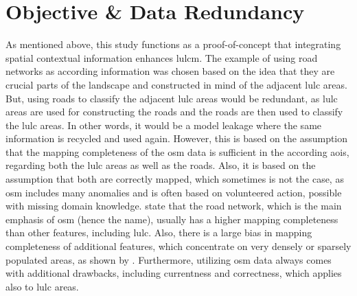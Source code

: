 \section{Objective \& Data Redundancy}

As mentioned above, this study functions as a proof-of-concept that integrating spatial contextual information enhances \gls{lulcm}. The example of using road networks as according information was chosen based on the idea that they are crucial parts of the landscape and constructed in mind of the adjacent \gls{lulc} areas. But, using roads to classify the adjacent \gls{lulc} areas would be redundant, as \gls{lulc} areas are used for constructing the roads and the roads are then used to classify the \gls{lulc} areas. In other words, it would be a model leakage where the same information is recycled and used again. However, this is based on the assumption that the mapping completeness of the \gls{osm} data is sufficient in the according \glspl{aoi}, regarding both the \gls{lulc} areas as well as the roads. Also, it is based on the assumption that both are correctly mapped, which sometimes is not the case, as \gls{osm} includes many anomalies and is often based on volunteered action, possible with missing domain knowledge. \textcite{Barrington-Leigh.Millard-Ball2017} state that the road network, which is the main emphasis of \gls{osm} (hence the name), usually has a higher mapping completeness than other features, including \gls{lulc}. Also, there is a large bias in mapping completeness of additional features, which concentrate on very densely or sparsely populated areas, as shown by \textcite{Herfort.Lautenbach.ea2021}. Furthermore, utilizing \gls{osm} data always comes with additional drawbacks, including currentness and correctness, which applies also to \gls{lulc} areas.

